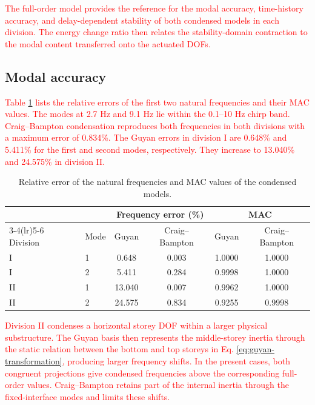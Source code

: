 \documentclass[11pt,a4paper]{article}
\numberwithin{equation}{section}
\newcommand{\rev}[1]{\textcolor{red}{#1}}
\begin{document}
\rev{The full-order model provides the reference for the modal accuracy, time-history accuracy, and delay-dependent stability of both condensed models in each division. The energy change ratio then relates the stability-domain contraction to the modal content transferred onto the actuated DOFs.}

\subsection{Modal accuracy}
\label{sec:modal-accuracy}

\rev{Table \ref{tab:modal} lists the relative errors of the first two natural frequencies and their MAC values. The modes at 2.7 Hz and 9.1 Hz lie within the 0.1--10 Hz chirp band. Craig--Bampton condensation reproduces both frequencies in both divisions with a maximum error of 0.834\%. The Guyan errors in division I are 0.648\% and 5.411\% for the first and second modes, respectively. They increase to 13.040\% and 24.575\% in division II.}

\begin{table}[htbp]
	\centering
	\caption{Relative error of the natural frequencies and MAC values of the condensed models.}
	\label{tab:modal}
	\begin{tabular}{llcccc}
		\toprule
		& & \multicolumn{2}{c}{Frequency error (\%)} & \multicolumn{2}{c}{MAC}\\
		\cmidrule(lr){3-4}\cmidrule(lr){5-6}
		Division & Mode & Guyan & Craig--Bampton & Guyan & Craig--Bampton\\
		\midrule
		I  & 1 & 0.648  & 0.003 & 1.0000 & 1.0000\\
		I  & 2 & 5.411  & 0.284 & 0.9998 & 1.0000\\
		\midrule
		II & 1 & 13.040 & 0.007 & 0.9962 & 1.0000\\
		II & 2 & 24.575 & 0.834 & 0.9255 & 0.9998\\
		\bottomrule
	\end{tabular}
\end{table}

\rev{Division II condenses a horizontal storey DOF within a larger physical substructure. The Guyan basis then represents the middle-storey inertia through the static relation between the bottom and top storeys in Eq. \eqref{eq:guyan-transformation}, producing larger frequency shifts. In the present cases, both congruent projections give condensed frequencies above the corresponding full-order values. Craig--Bampton retains part of the internal inertia through the fixed-interface modes and limits these shifts.}
\end{document}
